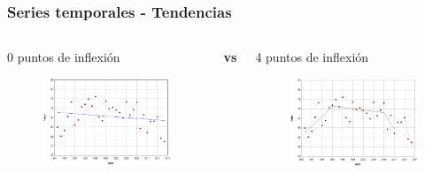 \documentclass{beamer}
\begin{document}
\begin{frame}\frametitle{Series temporales - Tendencias}
	\begin{columns}
		\begin{column}{0.5\textwidth}
			\centering \normalsize 0 puntos de inflexión
			\begin{figure}
				\includegraphics[width=\textwidth]{images/jpo0.png}
			\end{figure}
			
		\end{column}
		\large{\textbf{vs}}
		\begin{column}{0.5\textwidth}
			\centering \normalsize 4 puntos de inflexión
			\begin{figure}
				\centering
				\includegraphics[width=\textwidth]{images/jpo4.png}
			\end{figure}
		\end{column}
	\end{columns}


\end{frame}
\end{document}
